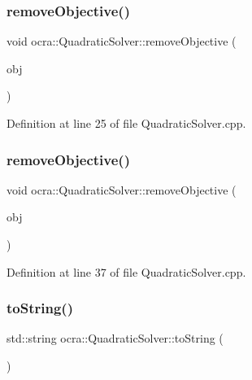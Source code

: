 \subsubsection{\texorpdfstring{remove\+Objective()}{removeObjective()}\hspace{0.1cm}{\footnotesize\ttfamily [1/2]}}
{\footnotesize\ttfamily void ocra\+::\+Quadratic\+Solver\+::remove\+Objective (\begin{DoxyParamCaption}\item[{\hyperlink{classocra_1_1QuadraticFunction}{Quadratic\+Function} \&}]{obj }\end{DoxyParamCaption})}



Definition at line 25 of file Quadratic\+Solver.\+cpp.

\hypertarget{classocra_1_1QuadraticSolver_a9b1f718481a8200d2135983fc247f146}{}\label{classocra_1_1QuadraticSolver_a9b1f718481a8200d2135983fc247f146} 
\subsubsection{\texorpdfstring{remove\+Objective()}{removeObjective()}\hspace{0.1cm}{\footnotesize\ttfamily [2/2]}}
{\footnotesize\ttfamily void ocra\+::\+Quadratic\+Solver\+::remove\+Objective (\begin{DoxyParamCaption}\item[{\hyperlink{namespaceocra_a0b50673710f087c0f1733aefd1a8e0f7}{Quadratic\+Objective} \&}]{obj }\end{DoxyParamCaption})}



Definition at line 37 of file Quadratic\+Solver.\+cpp.

\hypertarget{classocra_1_1QuadraticSolver_a1f4efd162b95e7688d0720805fb94445}{}\label{classocra_1_1QuadraticSolver_a1f4efd162b95e7688d0720805fb94445} 
\subsubsection{\texorpdfstring{to\+String()}{toString()}}
{\footnotesize\ttfamily std\+::string ocra\+::\+Quadratic\+Solver\+::to\+String (\begin{DoxyParamCaption}{ }\end{DoxyParamCaption})\hspace{0.3cm}{\ttfamily [virtual]}}

